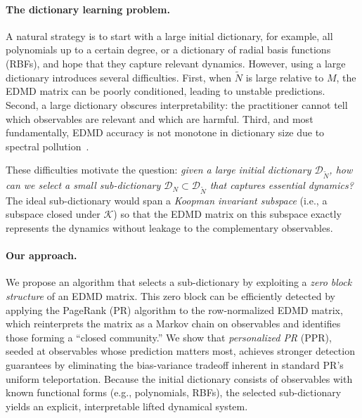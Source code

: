 \documentclass{article}
\theoremstyle{plain}
\theoremstyle{definition}
\def\Koop{\mathcal{K}}
\def\Dc{\mathcal{D}}
\begin{document}
	\paragraph{The dictionary learning problem.}
	A natural strategy is to start with a large initial dictionary, for example, all polynomials up to a certain degree, or a dictionary of radial basis functions (RBFs), and hope that they capture relevant dynamics. However, using a large dictionary introduces several difficulties. First, when $\tilde{N}$ is large relative to $M$, the EDMD matrix can be poorly conditioned, leading to unstable predictions. Second, a large dictionary obscures interpretability: the practitioner cannot tell which observables are relevant and which are harmful. Third, and most fundamentally, EDMD accuracy is not monotone in dictionary size due to spectral pollution~\cite{Colbrook2024-MultiverseDMD, colbrook2024rigorous}. 
	
	
	These difficulties motivate the question: \emph{given a large initial dictionary $\Dc_{\tilde{N}}$, how can we select a small sub-dictionary $\Dc_N \subset \Dc_{\tilde{N}}$ that captures essential dynamics?} The ideal sub-dictionary would span a \emph{Koopman invariant subspace} (i.e., a subspace closed under $\Koop$) so that the EDMD matrix on this subspace exactly represents the dynamics without leakage to the complementary observables.
	
	\paragraph{Our approach.}
	We propose an algorithm that selects a sub-dictionary by exploiting a \emph{zero block structure} of an EDMD matrix. This zero block can be efficiently detected by applying the PageRank (PR) algorithm to the row-normalized EDMD matrix, which reinterprets the matrix as a Markov chain on observables and identifies those forming a ``closed community.'' We show that \emph{personalized PR} (PPR), seeded at observables whose prediction matters most, achieves stronger detection guarantees by eliminating the bias-variance tradeoff inherent in standard PR's uniform teleportation. Because the initial dictionary consists of observables with known functional forms (e.g., polynomials, RBFs), the selected sub-dictionary yields an explicit, interpretable lifted dynamical system.
	
\end{document}
